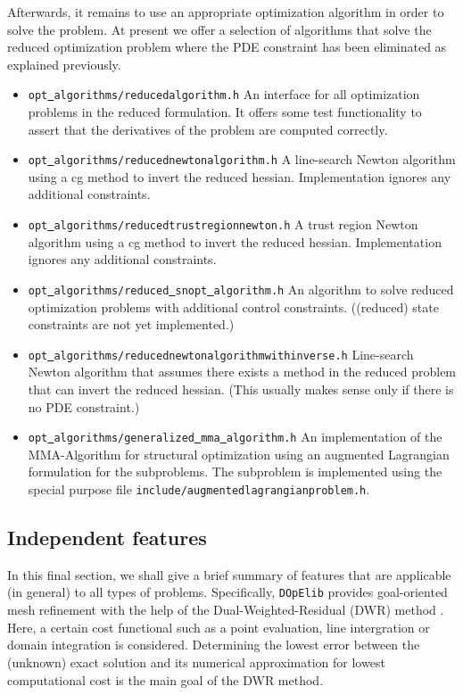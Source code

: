 \documentclass[prodmode,acmtoms]{acmsmall}
\numberwithin{equation}{section}
\newcommand{\dope}{\texttt{DOpElib}}
\begin{document}
Afterwards, it remains to use an appropriate 
optimization algorithm in order to solve the 
problem. At present we offer a selection of algorithms that solve the reduced optimization 
problem where the PDE constraint has been eliminated as explained previously.
\begin{itemize}
\item \texttt{opt\underline{ }algorithms/reducedalgorithm.h} An interface for all 
  optimization problems in the reduced formulation. It offers some test functionality
  to assert that the derivatives of the problem are computed correctly.
\item \texttt{opt\underline{ }algorithms/reducednewtonalgorithm.h}
  A line-search Newton algorithm using a cg method to invert the reduced hessian. 
  Implementation ignores any additional constraints.
\item \texttt{opt\underline{ }algorithms/reducedtrustregionnewton.h}
  A trust region Newton algorithm using a cg method to invert the reduced hessian.
  Implementation ignores any additional constraints.
\item \texttt{opt\underline{ }algorithms/reduced\underline{ }snopt\underline{ }algorithm.h}
  An algorithm to solve reduced optimization problems with additional control constraints.
  ((reduced) state constraints are not yet implemented.)
\item \texttt{opt\underline{ }algorithms/reducednewtonalgorithmwithinverse.h}
  Line-search Newton algorithm that assumes there exists a method in the reduced problem
  that can invert the reduced hessian. (This usually makes sense only if there is no 
  PDE constraint.)
\item \texttt{opt\underline{ }algorithms/generalized\underline{ }mma\underline{ }algorithm.h}
  An implementation of the MMA-Algorithm for structural optimization using an augmented
  Lagrangian formulation for the subproblems. The subproblem is implemented using the 
  special purpose file
  \texttt{include/augmentedlagrangianproblem.h}.
\end{itemize} 




\subsection{Independent features}
In this final section, we shall give a brief summary of features 
that are applicable (in general) to all types of problems. Specifically,
\dope{} provides goal-oriented mesh refinement with the help of the 
Dual-Weighted-Residual (DWR) method \cite{BeRa96}. Here, a certain 
cost functional such as a point evaluation, line intergration or domain
integration is considered. Determining the lowest error between the 
(unknown) exact solution and its numerical approximation for lowest computational
cost is the main goal of the DWR method.
\end{document}
